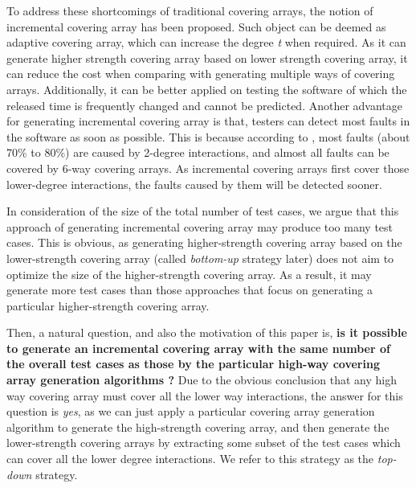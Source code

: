 \documentclass[conference]{IEEEtran}
\theoremstyle{definition}
\begin{document}

To address these shortcomings of traditional covering arrays, the notion of incremental covering array \cite{fouche2009incremental} has been proposed. Such object can be deemed as adaptive covering array, which can increase the degree \emph{t} when required. As it can generate higher strength covering array based on lower strength covering array, it can reduce the cost when comparing with generating multiple ways of covering arrays. Additionally, it can be better applied on testing the software of which the released time is  frequently changed and cannot be predicted. Another advantage for generating incremental covering array is that, testers can detect most faults in the software as soon as possible. This is because according to \cite{kuhn2002investigation}, most faults (about 70\% to 80\%) are caused by 2-degree interactions, and almost all faults can be covered by 6-way covering arrays. As incremental covering arrays first cover those lower-degree interactions, the faults caused by them will be detected sooner.


In consideration of the size of the total number of test cases, we argue that this approach of generating incremental covering array may produce too many test cases. This is obvious, as generating higher-strength covering array based on the lower-strength covering array (called \emph{bottom-up} strategy later) does not aim to optimize the size of the higher-strength covering array. As a result, it may generate more test cases than those approaches that focus on generating a particular higher-strength covering array.

Then, a natural question, and also the motivation of this paper is, \textbf{is it possible to generate an incremental covering array with the same number of the overall test cases as those by the particular high-way covering array generation algorithms ?}  Due to the obvious conclusion that any high way covering array must cover all the lower way interactions, the answer for this question is \emph{yes}, as we can just apply a particular covering array generation algorithm to generate the high-strength covering array, and then generate the lower-strength covering arrays by extracting some subset of the test cases which can cover all the lower degree interactions. We refer to this strategy as the \emph{top-down} strategy.
\end{document}
